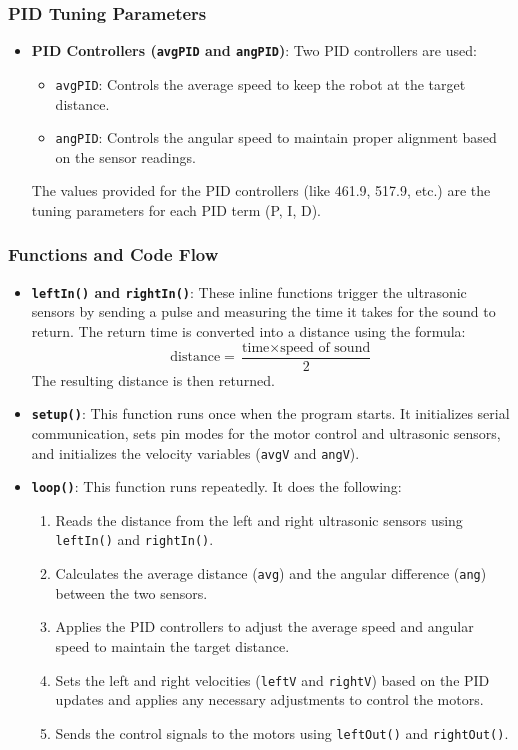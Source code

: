 \documentclass[a4paper,12pt]{article}
\begin{document}
\begin{lstlising}[language=C++]
\subsubsection{PID Tuning Parameters}
\begin{itemize}
\item \textbf{PID Controllers (\texttt{avgPID} and \texttt{angPID})}: Two PID controllers are used:
\begin{itemize}
\item \texttt{avgPID}: Controls the average speed to keep the robot at the target distance.
\item \texttt{angPID}: Controls the angular speed to maintain proper alignment based on the sensor readings.
\end{itemize}
The values provided for the PID controllers (like 461.9, 517.9, etc.) are the tuning parameters for each PID term (P, I, D).
\end{itemize}
\subsubsection{Functions and Code Flow}
\begin{itemize}
\item \textbf{\texttt{leftIn()} and \texttt{rightIn()}}: These inline functions trigger the ultrasonic sensors by sending a pulse and measuring the time it takes for the sound to return. The return time is converted into a distance using the formula:
\[
\text{distance} = \frac{\text{time} \times \text{speed of sound}}{2}
\]
The resulting distance is then returned.
\item \textbf{\texttt{setup()}}: This function runs once when the program starts. It initializes serial communication, sets pin modes for the motor control and ultrasonic sensors, and initializes the velocity variables (\texttt{avgV} and \texttt{angV}).
\item \textbf{\texttt{loop()}}: This function runs repeatedly. It does the following:
\begin{enumerate}
\item Reads the distance from the left and right ultrasonic sensors using \texttt{leftIn()} and \texttt{rightIn()}.
\item Calculates the average distance (\texttt{avg}) and the angular difference (\texttt{ang}) between the two sensors.
\item Applies the PID controllers to adjust the average speed and angular speed to maintain the target distance.
\item Sets the left and right velocities (\texttt{leftV} and \texttt{rightV}) based on the PID updates and applies any necessary adjustments to control the motors.
\item Sends the control signals to the motors using \texttt{leftOut()} and \texttt{rightOut()}.
\end{enumerate}
\end{itemize}

\end{lstlising}
\end{document}
